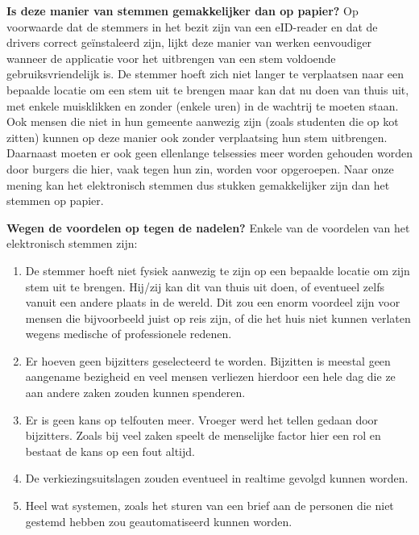 \documentclass[a4paper,12pt]{article}
\begin{document}
\textbf{Is deze manier van stemmen gemakkelijker dan op papier?} Op voorwaarde
dat de stemmers in het bezit zijn van een eID-reader en dat de drivers correct
ge\"instaleerd zijn, lijkt deze manier van werken eenvoudiger wanneer de
applicatie voor het uitbrengen van een stem voldoende gebruiksvriendelijk is. De
stemmer hoeft zich niet langer te verplaatsen naar een bepaalde locatie om een
stem uit te brengen maar kan dat nu doen van thuis uit, met enkele muisklikken
en zonder (enkele uren) in de wachtrij te moeten staan. Ook mensen die niet in
hun gemeente aanwezig zijn (zoals studenten die op kot zitten) kunnen op deze
manier ook zonder verplaatsing hun stem uitbrengen. Daarnaast moeten er ook geen
ellenlange telsessies meer worden gehouden worden door burgers die hier, vaak
tegen hun zin, worden voor opgeroepen. Naar onze mening kan het elektronisch
stemmen dus stukken gemakkelijker zijn dan het stemmen op papier.

\textbf{Wegen de voordelen op tegen de nadelen?} Enkele van de voordelen van het
elektronisch stemmen zijn:

\begin{enumerate}
  \item De stemmer hoeft niet fysiek aanwezig te zijn op een bepaalde locatie om
    zijn stem uit te brengen. Hij/zij kan dit van thuis uit doen, of eventueel
    zelfs vanuit een andere plaats in de wereld. Dit zou een enorm voordeel zijn
    voor mensen die bijvoorbeeld juist op reis zijn, of die het huis niet kunnen
    verlaten wegens medische of professionele redenen.

  \item Er hoeven geen bijzitters geselecteerd te worden. Bijzitten is meestal
    geen aangename bezigheid en veel mensen verliezen hierdoor een hele dag die
    ze aan andere zaken zouden kunnen spenderen.

  \item Er is geen kans op telfouten meer. Vroeger werd het tellen gedaan door
    bijzitters. Zoals bij veel zaken speelt de menselijke factor hier een rol en
    bestaat de kans op een fout altijd.

  \item De verkiezingsuitslagen zouden eventueel in realtime gevolgd kunnen
    worden.

  \item Heel wat systemen, zoals het sturen van een brief aan de personen die
    niet gestemd hebben zou geautomatiseerd kunnen worden.
\end{enumerate}
\end{document}
